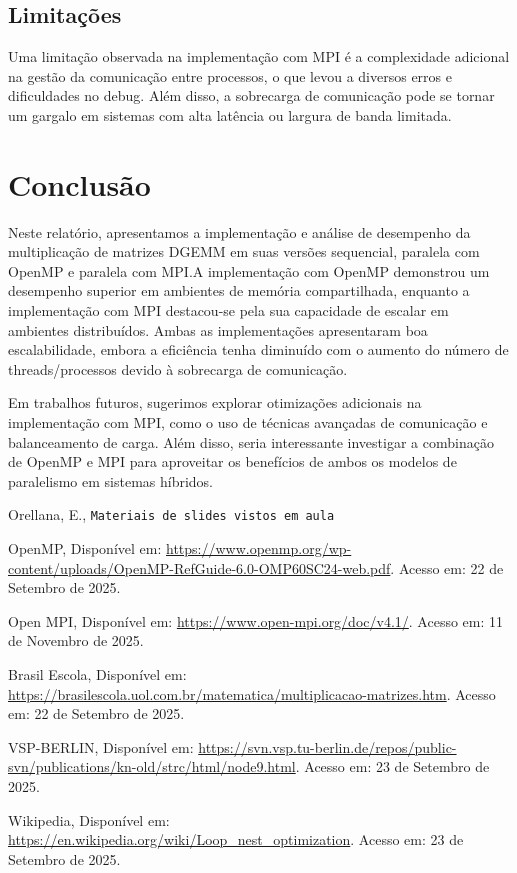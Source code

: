 \documentclass[12pt, a4paper]{article}
\begin{document}
    \subsection{Limitações}

    Uma limitação observada na implementação com MPI é a complexidade adicional na gestão da comunicação entre processos, o que levou a diversos erros e dificuldades no debug. Além disso, a sobrecarga de comunicação pode se tornar um gargalo em sistemas com alta latência ou largura de banda limitada.

    \newpage
    \section{Conclusão}\label{sec:conclusao}

    Neste relatório, apresentamos a implementação e análise de desempenho da multiplicação de matrizes DGEMM em suas versões sequencial, paralela com OpenMP e paralela com MPI.A implementação com OpenMP demonstrou um desempenho superior em ambientes de memória compartilhada, enquanto a implementação com MPI destacou-se pela sua capacidade de escalar em ambientes distribuídos. Ambas as implementações apresentaram boa escalabilidade, embora a eficiência tenha diminuído com o aumento do número de threads/processos devido à sobrecarga de comunicação.

    Em trabalhos futuros, sugerimos explorar otimizações adicionais na implementação com MPI, como o uso de técnicas avançadas de comunicação e balanceamento de carga. Além disso, seria interessante investigar a combinação de OpenMP e MPI para aproveitar os benefícios de ambos os modelos de paralelismo em sistemas híbridos.

    \newpage
    \begin{thebibliography}{9}
    \raggedright{}
         Orellana, E., \texttt{Materiais de slides vistos em aula}

         OpenMP, Disponível em: \url{https://www.openmp.org/wp-content/uploads/OpenMP-RefGuide-6.0-OMP60SC24-web.pdf}. Acesso em: 22 de Setembro de 2025.
        
         Open MPI, Disponível em: \url{https://www.open-mpi.org/doc/v4.1/}. Acesso em: 11 de Novembro de 2025.

         Brasil Escola, Disponível em: \url{https://brasilescola.uol.com.br/matematica/multiplicacao-matrizes.htm}. Acesso em: 22 de Setembro de 2025.

         VSP-BERLIN, Disponível em: \url{https://svn.vsp.tu-berlin.de/repos/public-svn/publications/kn-old/strc/html/node9.html}. Acesso em: 23 de Setembro de 2025.

         Wikipedia, Disponível em: \url{https://en.wikipedia.org/wiki/Loop\_nest\_optimization}. Acesso em: 23 de Setembro de 2025.
    \end{thebibliography}
\end{document}
